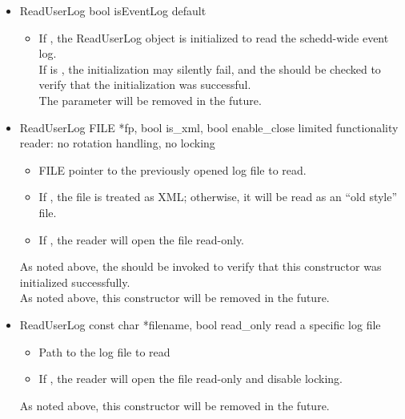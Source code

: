 \begin{itemize}

\item \Constructor
  {ReadUserLog}
  {bool isEventLog}
  {default}
  \begin{itemize}
  \item {}
    If , the ReadUserLog object is
    initialized to read the schedd-wide event log.
    \\ \Note If  is , the initialization may
    silently fail, and the  should be
    checked to verify that the initialization was successful.
    \\ \Note The  parameter will be removed in the future.
  \end{itemize}

\item \Constructor
  {ReadUserLog}
  {FILE *fp, bool is\_xml, bool enable\_close}
  {limited functionality reader: no rotation handling, no locking}
  \begin{itemize}
  \item {}
    FILE pointer to the previously opened log file to read.
  \item {}
    If , the file is treated as XML; otherwise, it will be
    read as an ``old style'' file.
  \item {}
    If , the reader will open the file read-only.
  \end{itemize}
  \Note As noted above, the 
  should be invoked to verify that this constructor was initialized
  successfully.
  \\ \Note As noted above, this constructor will be removed in the future.

\item \Constructor
  {ReadUserLog}
  {const char *filename, bool read\_only}
  {read a specific log file}
  \begin{itemize}
  \item {}
    Path to the log file to read
  \item {}
    If , the reader will open the file read-only and
    disable locking.
  \end{itemize}
  \Note As noted above, this constructor will be removed in the future.


\end{itemize}
